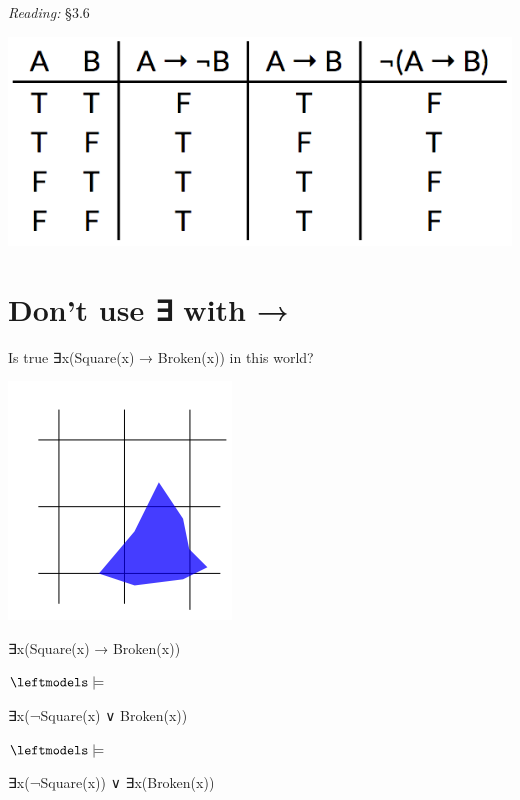 \documentclass[12pt]{extarticle}
\begin{document}
\begin{multicols*}{3}
\emph{Reading:} §3.6
 
\begin{center}
\includegraphics[scale=0.3]{img/unit_237_tt.png}
\end{center}
 
 
\section{Don't use ∃ with →}
 
\begin{minipage}{\columnwidth}
 
Is true ∃x(Square(x) → Broken(x)) in this world?
 
\begin{center}
\includegraphics[scale=0.3]{img/word_02.png}
\end{center}
\end{minipage}
 
∃x(Square(x) → Broken(x))
 
\hspace{3mm} $\leftmodels\models$
 
∃x(¬Square(x) ∨ Broken(x))
 
\hspace{3mm} $\leftmodels\models$
 
∃x(¬Square(x)) ∨ ∃x(Broken(x))
 
 
 

\end{multicols*}
\end{document}
